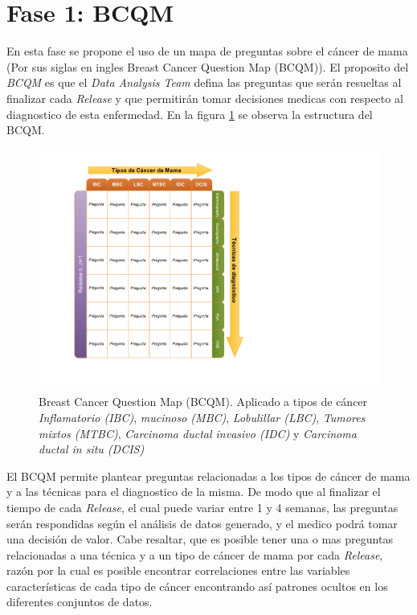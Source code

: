 \section{Fase 1: BCQM} 
En esta fase se propone el uso de un mapa de preguntas sobre el cáncer de mama (Por sus siglas en ingles Breast Cancer Question Map (BCQM)). El proposito del \textit{BCQM} es que el \textit{Data Analysis Team} defina las preguntas que serán resueltas al finalizar cada \textit{Release} y que permitirán tomar decisiones medicas con respecto al diagnostico de esta enfermedad. En la figura \ref{BCQM} se observa la estructura del BCQM.

\begin{figure}
	\centering
	\includegraphics[width=0.8
	\linewidth]{IMAGENES/BCQM_SPANISH}
	\caption{Breast Cancer Question Map (BCQM). Aplicado a tipos de cáncer \textit{Inflamatorio (IBC)}, \textit{mucinoso (MBC)}, \textit{Lobulillar (LBC)}, \textit{Tumores mixtos (MTBC)}, \textit{Carcinoma ductal invasivo (IDC)} y \textit{Carcinoma ductal in situ (DCIS)}}
	\label{BCQM}
\end{figure}

El BCQM permite plantear preguntas relacionadas a los tipos de cáncer de mama y a las técnicas para el diagnostico de la misma. De modo que al finalizar el tiempo de cada \textit{Release}, el cual puede variar entre 1 y 4 semanas, las preguntas serán respondidas según el análisis de datos generado, y el medico podrá tomar una decisión de valor. Cabe resaltar, que es posible tener una o mas preguntas relacionadas a una técnica y a un tipo de cáncer de mama por cada \textit{Release}, razón por la cual es posible encontrar correlaciones entre las variables características de cada tipo de cáncer encontrando así patrones ocultos en los diferentes conjuntos de datos.

